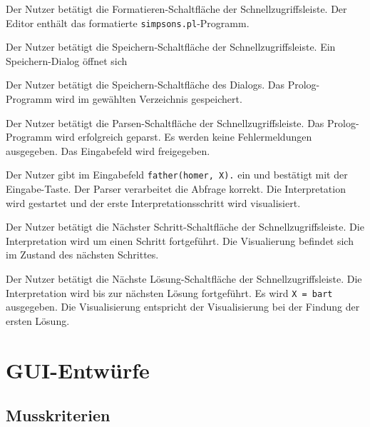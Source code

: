 \documentclass[parskip=full,11pt,twoside]{scrartcl}
\begin{document}
{Der Nutzer betätigt die Formatieren-Schaltfläche der Schnellzugriffsleiste.}
{Der Editor enthält das formatierte \texttt{simpsons.pl}-Programm.}

{Der Nutzer betätigt die Speichern-Schaltfläche der Schnellzugriffsleiste.}
{Ein Speichern-Dialog öffnet sich}

{Der Nutzer betätigt die Speichern-Schaltfläche des Dialogs.}
{Das Prolog-Programm wird im gewählten Verzeichnis gespeichert.}

{Der Nutzer betätigt die Parsen-Schaltfläche der Schnellzugriffsleiste.}
{Das Prolog-Programm wird erfolgreich geparst. Es werden keine Fehlermeldungen ausgegeben. Das Eingabefeld wird freigegeben.}

{Der Nutzer gibt im Eingabefeld \texttt{father(homer, X).} ein und bestätigt mit der Eingabe-Taste.}
{Der Parser verarbeitet die Abfrage korrekt. Die Interpretation wird gestartet und der erste Interpretationsschritt wird visualisiert.}

{Der Nutzer betätigt die Nächster Schritt-Schaltfläche der Schnellzugriffsleiste.}
{Die Interpretation wird um einen Schritt fortgeführt. Die Visualierung befindet sich im Zustand des nächsten Schrittes.}

{Der Nutzer betätigt die Nächste Lösung-Schaltfläche der Schnellzugriffsleiste.}
{Die Interpretation wird bis zur nächsten Lösung fortgeführt. Es wird \texttt{X = bart} ausgegeben. Die Visualisierung entspricht der Visualisierung bei der Findung der ersten Lösung.}

\appendix

\section{GUI-Entwürfe}

\subsection{Musskriterien}
\end{document}
